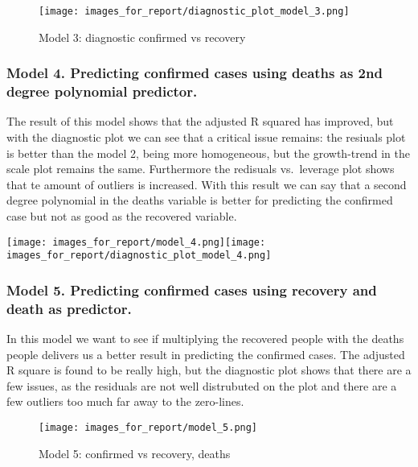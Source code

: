 \documentclass[11pt]{article}
\makeatletter
\def\maxwidth{\ifdim\Gin@nat@width>\linewidth\linewidth
    \else\Gin@nat@width\fi}
\let\Oldincludegraphics\includegraphics
\renewcommand{\includegraphics}[1]{\Oldincludegraphics[width=.8\maxwidth]{#1}}
\makeatother
\begin{document}
\begin{figure}
\centering
\texttt{[image: images\_for\_report/diagnostic\_plot\_model\_3.png]}
\caption{Model 3: diagnostic confirmed vs recovery}
\end{figure}

\hypertarget{model-4.-predicting-confirmed-cases-using-deaths-as-2nd-degree-polynomial-predictor.}{%
\subsubsection{Model 4. Predicting confirmed cases using deaths as 2nd
degree polynomial
predictor.}\label{model-4.-predicting-confirmed-cases-using-deaths-as-2nd-degree-polynomial-predictor.}}

The result of this model shows that the adjusted R squared has improved,
but with the diagnostic plot we can see that a critical issue remains:
the resiuals plot is better than the model 2, being more homogeneous,
but the growth-trend in the scale plot remains the same. Furthermore the
redisuals vs.~leverage plot shows that te amount of outliers is
increased. With this result we can say that a second degree polynomial
in the deaths variable is better for predicting the confirmed case but
not as good as the recovered variable.

\texttt{[image: images\_for\_report/model\_4.png]}\texttt{[image: images\_for\_report/diagnostic\_plot\_model\_4.png]}

\hypertarget{model-5.-predicting-confirmed-cases-using-recovery-and-death-as-predictor.}{%
\subsubsection{Model 5. Predicting confirmed cases using recovery and
death as
predictor.}\label{model-5.-predicting-confirmed-cases-using-recovery-and-death-as-predictor.}}

In this model we want to see if multiplying the recovered people with
the deaths people delivers us a better result in predicting the
confirmed cases. The adjusted R square is found to be really high, but
the diagnostic plot shows that there are a few issues, as the residuals
are not well distrubuted on the plot and there are a few outliers too
much far away to the zero-lines.

\begin{figure}
\centering
\texttt{[image: images\_for\_report/model\_5.png]}
\caption{Model 5: confirmed vs recovery, deaths}
\end{figure}
\end{document}

